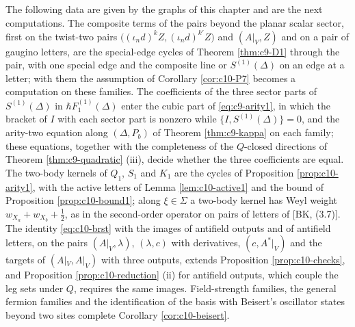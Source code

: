 \begin{remark}
\label{rem:c10-next}
The following data are given by the graphs of this chapter and are the next computations. The composite terms of the pairs beyond the planar scalar sector, first on the twist-two pairs $\big((\iota_nd)^kZ,(\iota_nd)^{k'}Z\big)$ and $(A|_V,Z)$ and on a pair of gaugino letters, are the special-edge cycles of Theorem \ref{thm:c9-D1} through the pair, with one special edge and the composite line or $S^{(1)}(\Delta)$ on an edge at a letter; with them the assumption of Corollary \ref{cor:c10-P7} becomes a computation on these families. The coefficients of the three sector parts of $S^{(1)}(\Delta)$ in $\hbar F_1^{(1)}(\Delta)$ enter the cubic part of \eqref{eq:c9-arity1}, in which the bracket of $I$ with each sector part is nonzero while $\{I,S^{(1)}(\Delta)\}=0$, and the arity-two equation along $(\Delta,P_b)$ of Theorem \ref{thm:c9-kappa} on each family; these equations, together with the completeness of the $Q$-closed directions of Theorem \ref{thm:c9-quadratic} (iii), decide whether the three coefficients are equal. The two-body kernels of $Q_1$, $S_1$ and $K_1$ are the cycles of Proposition \ref{prop:c10-arity1}, with the active letters of Lemma \ref{lem:c10-active1} and the bound of Proposition \ref{prop:c10-bound1}; along $\xi\in\Sigma$ a two-body kernel has Weyl weight $w_{X_a}+w_{X_b}+\tfrac12$, as in the second-order operator on pairs of letters of [BK, (3.7)]. The identity \eqref{eq:c10-brst} with the images of antifield outputs and of antifield letters, on the pairs $(A|_V,\lambda)$, $(\lambda,c)$ with derivatives, $(c,A^*|_V)$ and the targets of $(A|_V,A|_V)$ with three outputs, extends Proposition \ref{prop:c10-checks}, and Proposition \ref{prop:c10-reduction} (ii) for antifield outputs, which couple the leg sets under $Q$, requires the same images. Field-strength families, the general fermion families and the identification of the basis with Beisert's oscillator states beyond two sites complete Corollary \ref{cor:c10-beisert}.
\end{remark}

